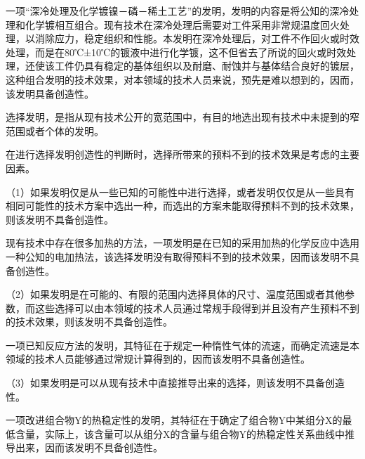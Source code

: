 {\par}

一项“深冷处理及化学镀镍－磷－稀土工艺”的发明，发明的内容是将公知的深冷处理和化学镀相互组合。现有技术在深冷处理后需要对工件采用非常规温度回火处理，以消除应力，稳定组织和性能。本发明在深冷处理后，对工件不作回火或时效处理，而是在80℃±10℃的镀液中进行化学镀，这不但省去了所说的回火或时效处理，还使该工件仍具有稳定的基体组织以及耐磨、耐蚀并与基体结合良好的镀层，这种组合发明的技术效果，对本领域的技术人员来说，预先是难以想到的，因而，该发明具备创造性。

选择发明，是指从现有技术公开的宽范围中，有目的地选出现有技术中未提到的窄范围或者个体的发明。

在进行选择发明创造性的判断时，选择所带来的预料不到的技术效果是考虑的主要因素。

{\setlength{\parindent}{17.1bp}（1）如果发明仅是从一些已知的可能性中进行选择，或者发明仅仅是从一些具有相同可能性的技术方案中选出一种，而选出的方案未能取得预料不到的技术效果，则该发明不具备创造性。\par}

{\par}

现有技术中存在很多加热的方法，一项发明是在已知的采用加热的化学反应中选用一种公知的电加热法，该选择发明没有取得预料不到的技术效果，因而该发明不具备创造性。

{\setlength{\parindent}{17.1bp}（2）如果发明是在可能的、有限的范围内选择具体的尺寸、温度范围或者其他参数，而这些选择可以由本领域的技术人员通过常规手段得到并且没有产生预料不到的技术效果，则该发明不具备创造性。\par}

{\par}

一项已知反应方法的发明，其特征在于规定一种惰性气体的流速，而确定流速是本领域的技术人员能够通过常规计算得到的，因而该发明不具备创造性。

{\setlength{\parindent}{17.1bp}（3）如果发明是可以从现有技术中直接推导出来的选择，则该发明不具备创造性。\par}

{\par}

一项改进组合物Y的热稳定性的发明，其特征在于确定了组合物Y中某组分X的最低含量，实际上，该含量可以从组分X的含量与组合物Y的热稳定性关系曲线中推导出来，因而该发明不具备创造性。

